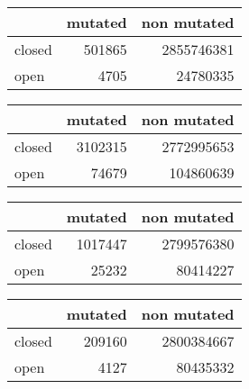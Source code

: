 \begin{table}[!htb]
    \begin{subtable}[!h]{.5\textwidth}
        \centering
        \begin{tabular}{ l r r }
        \bf{} & \bf{mutated} & \bf{non mutated} \\
        \hline
        closed &  501865 &  2855746381 \\
        open &    4705 &    24780335 \\
        \end{tabular}
        \vspace{0.2cm}
    \end{subtable} 
    \quad %
    \begin{subtable}[!h]{.5\textwidth}
        \centering
        \begin{tabular}{ l r r }
        \bf{} & \bf{mutated} & \bf{non mutated} \\
        \hline
        closed & 3102315 &  2772995653 \\
        open &   74679 &   104860639 \\
        \end{tabular}
        \vspace{0.2cm}
    \end{subtable}  
    \vspace{0.5cm}
    
    \begin{subtable}[!h]{.5\textwidth}
        \centering
        \begin{tabular}{ l r r }
        \bf{} & \bf{mutated} & \bf{non mutated} \\
        \hline
        closed & 1017447 &  2799576380 \\
        open &   25232 &    80414227 \\
        \end{tabular}
        \vspace{0.2cm}
    \end{subtable} 
    \quad %
    \begin{subtable}[!h]{.5\textwidth}
        \centering
        \begin{tabular}{ l r r }
        \bf{} & \bf{mutated} & \bf{non mutated} \\
        \hline
        closed &  209160 &  2800384667 \\
        open &    4127 &    80435332 \\
        \end{tabular}
        \vspace{0.2cm}
    \end{subtable}  
    \vspace{0.5cm}
    

\end{table}
